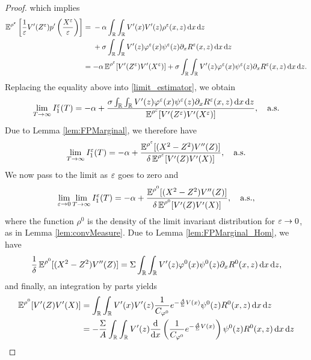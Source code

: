 \documentclass[10pt]{article}
\begin{document}
\begin{proof}
which implies
\begin{align}
	\operatorname{\mathbb{E}}^{\rho^\varepsilon} \left [ \frac{1}{\varepsilon} V'(Z^\varepsilon) p' \left ( \frac{X^\varepsilon}{\varepsilon} \right ) \right ] &= 
	\begin{aligned}[t]
		&-\alpha \int_{\mathbb{R}} \int_{\mathbb{R}} V'(x) V'(z) \rho^\varepsilon(x, z) \,\mathrm{d} x \,\mathrm{d} z \\
		&+\sigma \int_{\mathbb{R}} \int_{\mathbb{R}} V'(z) \varphi^\varepsilon(x) \psi^\varepsilon(z) \partial_x R^\varepsilon(x,z) \,\mathrm{d} x \,\mathrm{d} z 
	\end{aligned}
	\\
	&= - \alpha \operatorname{\mathbb{E}}^{\rho^\varepsilon} [ V'(Z^\varepsilon) V'(X^\varepsilon) ] + \sigma \int_{\mathbb{R}} \int_{\mathbb{R}} V'(z) \varphi^\varepsilon(x) \psi^\varepsilon(z) \partial_x R^\varepsilon(x,z) \,\mathrm{d} x \,\mathrm{d} z.
\end{align}
Replacing the equality above into \eqref{limit_estimator}, we obtain
\begin{equation}
\lim_{T \to \infty} I_1^\varepsilon(T) = -\alpha + \frac{\sigma \int_{\mathbb{R}} \int_{\mathbb{R}} V'(z) \varphi^\varepsilon(x) \psi^\varepsilon(z) \partial_x R^\varepsilon(x,z) \,\mathrm{d} x \,\mathrm{d} z}{\operatorname{\mathbb{E}}^{\rho^\varepsilon} [ V'(Z^\varepsilon) V'(X^\varepsilon) ]}, \quad \text{a.s.}
\end{equation}
Due to Lemma \ref{lem:FPMarginal}, we therefore have
\begin{equation}
	\lim_{T \to \infty} I_1^\varepsilon(T) = -\alpha + \frac{\operatorname{\mathbb{E}}^{\rho^\varepsilon}[(X^2 - Z^2)V''(Z)]}{\delta \operatorname{\mathbb{E}}^{\rho^\varepsilon}[V'(Z) V'(X)]}, \quad \text{a.s.}	
\end{equation}
We now pass to the limit as $\varepsilon$ goes to zero and
\begin{equation} \label{limit_estimator_2}
	\lim_{\varepsilon \to 0} \lim_{T \to \infty} I_1^\varepsilon(T) = -\alpha + \frac{\operatorname{\mathbb{E}}^{\rho^0}[(X^2 - Z^2)V''(Z)]}{\delta \operatorname{\mathbb{E}}^{\rho^0}[V'(Z) V'(X)]}, \quad \text{a.s.},
\end{equation}
where the function $\rho^0$ is the density of the limit invariant distribution for $\varepsilon \to 0$, as in Lemma \ref{lem:convMeasure}. Due to Lemma \ref{lem:FPMarginal_Hom}, we have
\begin{equation}\label{eq:final_result}
\frac{1}{\delta} \operatorname{\mathbb{E}}^{\rho^0}[(X^2 - Z^2)V''(Z)] = \Sigma \int_{\mathbb{R}} \int_{\mathbb{R}} V'(z) \varphi^0(x) \psi^0(z) \partial_x R^0(x,z) \,\mathrm{d} x \,\mathrm{d} z,
\end{equation}
and finally, an integration by parts yields
\begin{align}
	\E^{\rho^0}[V'(Z) V'(X)] &= \int_{\R} \int_{\R} V'(x) V'(z) \frac{1}{C_{\phi^0}} e^{-\frac{A}{\Sigma} V(x)} \psi^0(z) R^0(x,z) \dd x \dd z \\
	&= - \frac{\Sigma}{A} \int_{\R} \int_{\R} V'(z) \frac{\d}{\d x} \left(\frac{1}{C_{\phi^0}} e^{-\frac{A}{\Sigma} V(x)} \right ) \psi^0(z) R^0(x,z) \dd x \dd z \\

\end{align}
\end{proof}
\end{document}

